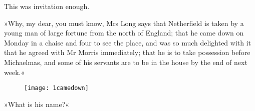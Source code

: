 {\begin{figure}[t!]
	\end{figure}
}
\makeatother
 
 

 \thispagestyle{plain}
 \clearpage

%
%
%
%



This was invitation enough.

»Why, my dear, you must know, Mrs Long says that Netherfield is taken by a young man of large fortune from the north of England; that he came down on Monday in a chaise and four to see the place, and was so much delighted with it that he agreed with Mr Morris immediately; that he is to take possession before Michaelmas, and some of his servants are to be in the house by the end of next week.«

\begin{figure}[tbh]
\centering
\texttt{[image: 1camedown]}
\end{figure}

»What is his name?«


